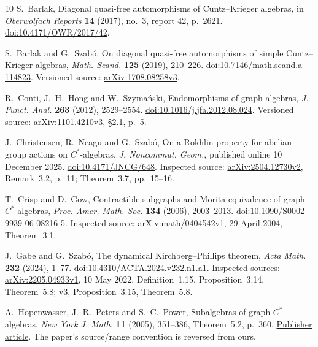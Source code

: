 \documentclass[11pt,a4paper]{article}
\theoremstyle{definition}
\begin{document}
\begin{thebibliography}{10}\small
{} S.~Barlak, Diagonal quasi-free automorphisms of
Cuntz--Krieger algebras, in \emph{Oberwolfach Reports} \textbf{14}
(2017), no.~3, report 42, p.~2621.
\href{https://doi.org/10.4171/OWR/2017/42}{doi:10.4171/OWR/2017/42}.

 S.~Barlak and G.~Szab\'o, On diagonal quasi-free
automorphisms of simple Cuntz--Krieger algebras,
\emph{Math. Scand.} \textbf{125} (2019), 210--226.
\href{https://doi.org/10.7146/math.scand.a-114823}{doi:10.7146/math.scand.a-114823}.
Versioned source: \href{https://arxiv.org/abs/1708.08258v3}{arXiv:1708.08258v3}.

 R.~Conti, J.~H.~Hong and W.~Szyma\'nski, Endomorphisms
of graph algebras, \emph{J. Funct. Anal.} \textbf{263} (2012), 2529--2554.
\href{https://doi.org/10.1016/j.jfa.2012.08.024}{doi:10.1016/j.jfa.2012.08.024}.
Versioned source: \href{https://arxiv.org/abs/1101.4210v3}{arXiv:1101.4210v3}, \S2.1, p.~5.

 J.~Christensen, R.~Neagu and G.~Szab\'o, On a Rokhlin
property for abelian group actions on $C^*$-algebras,
\emph{J. Noncommut. Geom.}, published online 10 December 2025.
\href{https://doi.org/10.4171/JNCG/648}{doi:10.4171/JNCG/648}.
Inspected source: \href{https://arxiv.org/abs/2504.12730v2}{arXiv:2504.12730v2},
Remark~3.2, p.~11; Theorem~3.7, pp.~15--16.

 T.~Crisp and D.~Gow, Contractible subgraphs and Morita
equivalence of graph $C^*$-algebras, \emph{Proc. Amer. Math. Soc.}
\textbf{134} (2006), 2003--2013.
\href{https://doi.org/10.1090/S0002-9939-06-08216-5}{doi:10.1090/S0002-9939-06-08216-5}.
Inspected source: \href{https://arxiv.org/abs/math/0404542v1}{arXiv:math/0404542v1},
29 April 2004, Theorem~3.1.

 J.~Gabe and G.~Szab\'o, The dynamical Kirchberg--Phillips
theorem, \emph{Acta Math.} \textbf{232} (2024), 1--77.
\href{https://doi.org/10.4310/ACTA.2024.v232.n1.a1}{doi:10.4310/ACTA.2024.v232.n1.a1}.
Inspected sources: \href{https://arxiv.org/abs/2205.04933v1}{arXiv:2205.04933v1},
10 May 2022, Definition~1.15, Proposition~3.14, Theorem~5.8;
\href{https://arxiv.org/abs/2205.04933v3}{v3}, Proposition~3.15, Theorem~5.8.

 A.~Hopenwasser, J.~R.~Peters and S.~C.~Power,
Subalgebras of graph $C^*$-algebras, \emph{New York J. Math.}
\textbf{11} (2005), 351--386, Theorem~5.2, p.~360.
\href{https://nyjm.albany.edu/j/2005/11-18.html}{Publisher article}.
The paper's source/range convention is reversed from ours.


\end{thebibliography}
\end{document}
